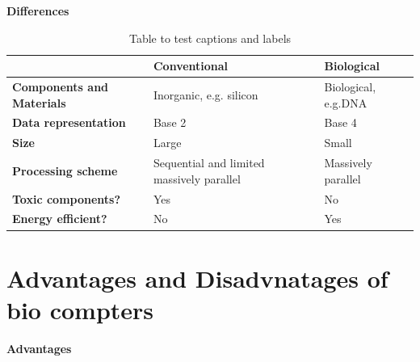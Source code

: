 \hspace{-12pt}\textbf{Differences}
\\ 
\begin{table}[h!]
\begin{center}{
\begin{tabular}{| m{7em} | m{4cm} | m{4cm} | }
  \hline
  \textbf{} & \textbf{Conventional} & \textbf{Biological}\\
  \hline
  \textbf{Components and Materials} & Inorganic, e.g. silicon & Biological, e.g.DNA\\ 
  \hline
  \textbf{Data representation} & Base 2  & Base 4\\
  \hline
  \textbf{Size} & Large & Small\\
  \hline
  \textbf{Processing scheme} & Sequential and limited massively parallel & Massively parallel\\
  \hline
  \textbf{Toxic components?} & Yes & No\\
  \hline
  \textbf{Energy efficient?} & No & Yes\\
  \hline
\end{tabular}
}
\caption{Table to test captions and labels}
\label{table:1}
\end{center}
\end{table}

\section{Advantages and Disadvnatages of bio compters}

\textbf{Advantages}

